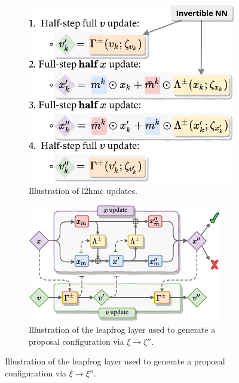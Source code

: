 \documentclass[a4paper,11pt]{article}
\begin{document}
\begin{figure}
    \centering
    \begin{subfigure}[b]{0.4\textwidth}
        \includegraphics[width=\textwidth]{assets/update_steps1.pdf}
        \caption{\label{subfig:updates}Illustration of l2hmc updates.}
    \end{subfigure}
    \hfill
    \begin{subfigure}[b]{0.58\textwidth}
        \includegraphics[width=\textwidth]{assets/leapfrog_layer.pdf}
        \caption{\label{subfig:lfupdate}Illustration of the leapfrog layer used
        to generate a proposal configuration via \(\xi\rightarrow \xi''\).}
    \end{subfigure}
    \vspace{1em}

\end{figure}
\end{document}
